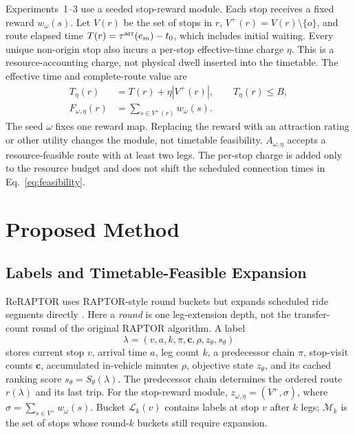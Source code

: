 Experiments~1--3 use a seeded stop-reward module. Each stop receives a fixed
reward \(w_\omega(s)\). Let \(V(r)\) be the set of stops in \(r\),
\(V^+(r)=V(r)\setminus\{o\}\), and
route elapsed time \(T(r)=\tau^{\rm arr}(e_m)-t_0\), which includes initial
waiting.
Every unique non-origin stop also incurs a per-stop effective-time charge
\(\eta\). This is a resource-accounting charge, not physical dwell inserted
into the timetable. The effective time and complete-route value are
\begin{equation}
    \label{eq:objective_stop_reward}
    \begin{aligned}
        T_\eta(r)&=T(r)+\eta|V^+(r)|,\qquad T_\eta(r)\le B,\\
        F_{\omega,\eta}(r)&=\sum_{s\in V^+(r)}w_\omega(s).
    \end{aligned}
\end{equation}
The seed \(\omega\) fixes one reward map. Replacing the reward with an attraction
rating or other utility changes the module, not timetable feasibility.
\(A_{\omega,\eta}\) accepts a resource-feasible route with at least two legs.
The per-stop charge is added only to the resource budget and does not shift the
scheduled connection times in Eq.~\ref{eq:feasibility}.

\section{Proposed Method}
\subsection{Labels and Timetable-Feasible Expansion}
ReRAPTOR uses RAPTOR-style round buckets but expands scheduled ride segments
directly \cite{delling2015raptor,he2022paretojourneys}. Here a \emph{round} is
one leg-extension depth, not the transfer-count round of the original RAPTOR
algorithm. A label
\begin{equation}
    \label{eq:label}
    \lambda=(v,a,k,\pi,\mathbf c,\rho,z_\theta,s_\theta)
\end{equation}
stores current stop \(v\), arrival time \(a\), leg count \(k\), a predecessor
chain \(\pi\), stop-visit counts \(\mathbf c\), accumulated in-vehicle minutes
\(\rho\), objective state \(z_\theta\), and its cached ranking score
\(s_\theta=S_\theta(\lambda)\). The predecessor
chain determines the ordered route \(r(\lambda)\) and its last trip. For the stop-reward
module, \(z_{\omega,\eta}=(V^+,\sigma)\), where
\(\sigma=\sum_{s\in V^+}w_\omega(s)\). Bucket \(\mathcal L_k(v)\) contains
labels at stop \(v\) after \(k\) legs; \(\mathcal M_k\) is the set of stops
whose round-\(k\) buckets still require expansion.

